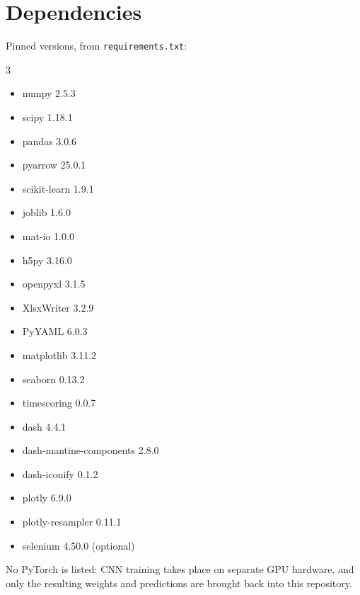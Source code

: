 \section{Dependencies}

Pinned versions, from \texttt{requirements.txt}:

\begin{multicols}{3}
\small
\begin{itemize}[leftmargin=1.2em,itemsep=0pt]
  \item numpy 2.5.3
  \item scipy 1.18.1
  \item pandas 3.0.6
  \item pyarrow 25.0.1
  \item scikit-learn 1.9.1
  \item joblib 1.6.0
  \item mat-io 1.0.0
  \item h5py 3.16.0
  \item openpyxl 3.1.5
  \item XlsxWriter 3.2.9
  \item PyYAML 6.0.3
  \item matplotlib 3.11.2
  \item seaborn 0.13.2
  \item timescoring 0.0.7
  \item dash 4.4.1
  \item dash-mantine-components 2.8.0
  \item dash-iconify 0.1.2
  \item plotly 6.9.0
  \item plotly-resampler 0.11.1
  \item selenium 4.50.0 (optional)
\end{itemize}
\end{multicols}

No PyTorch is listed: CNN training takes place on separate GPU hardware, and only the resulting
weights and predictions are brought back into this repository.
